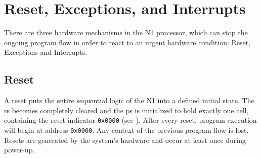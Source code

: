 
\section{Reset, Exceptions, and Interrupts}
\label{reset}

There are three hardware mechanisms in the N1 processor, which can stop the ongoing
program flow in order to react to an urgent hardware condition:
Reset, Exceptions and Interrupts.

\subsection{Reset}
\label{reset:rst}
A reset puts the entire sequential logic of the N1 into a defined initial state.
The \gls{rs} becomes completely cleared and the \gls{ps} is initialized
to hold exactly one cell, containing the reset indicator \texttt{0x0000} (see ).
After every reset, program execution will begin at address \texttt{0x0000}.
Any context of the previous program flow is lost.
Resets are generated by the system's hardware and occur at least once during power-up.

